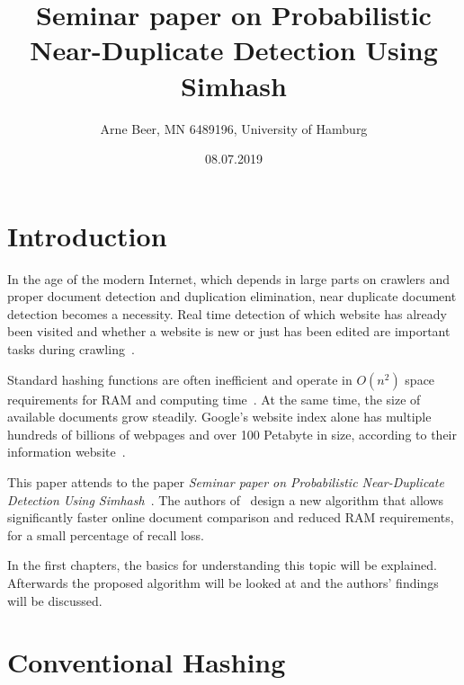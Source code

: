 \documentclass[12pt,twocolumn,a4paper,DIV=calc]{scrartcl}
\begin{document}
\title{Seminar paper on Probabilistic Near-Duplicate Detection Using Simhash}
\author{Arne Beer, MN 6489196, University of Hamburg}
\date{08.07.2019}

\maketitle


\section{Introduction}

In the age of the modern Internet, which depends in large parts on crawlers and proper document detection and duplication elimination, near duplicate document detection becomes a necessity.
Real time detection of which website has already been visited and whether a website is new or just has been edited are important tasks during crawling~\cite{paper:scaling_six_billion}.

Standard hashing functions are often inefficient and operate in $O(n^2)$ space requirements for RAM and computing time~\cite{book:hashing}.
At the same time, the size of available documents grow steadily.
Google's website index alone has multiple hundreds of billions of webpages and over 100 Petabyte in size, according to their information website~\cite{info:google_stats}.

This paper attends to the paper \emph{Seminar paper on Probabilistic Near-Duplicate Detection Using Simhash}~\cite{inproc:main}.
The authors of~\cite{inproc:main} design a new algorithm that allows significantly faster online document comparison and reduced RAM requirements, for a small percentage of recall loss.

In the first chapters, the basics for understanding this topic will be explained.
Afterwards the proposed algorithm will be looked at and the authors' findings will be discussed.

\section{Conventional Hashing}
\end{document}
